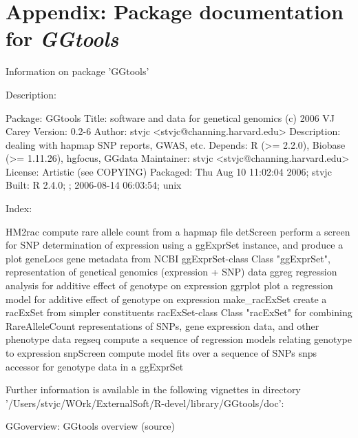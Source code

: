 \documentclass[12pt]{article}
\newcommand{\Rpackage}[1]{{\textit{#1}}}
\begin{document}
\section{Appendix: Package documentation for \Rpackage{GGtools}}
\begin{Schunk}
\begin{Soutput}
		Information on package 'GGtools'

Description:


Package:       GGtools
Title:         software and data for genetical genomics (c) 2006 VJ
               Carey
Version:       0.2-6
Author:        stvjc <stvjc@channing.harvard.edu>
Description:   dealing with hapmap SNP reports, GWAS, etc.
Depends:       R (>= 2.2.0), Biobase (>= 1.11.26), hgfocus, GGdata
Maintainer:    stvjc <stvjc@channing.harvard.edu>
License:       Artistic (see COPYING)
Packaged:      Thu Aug 10 11:02:04 2006; stvjc
Built:         R 2.4.0; ; 2006-08-14 06:03:54; unix


Index:


HM2rac                  compute rare allele count from a hapmap file
detScreen               perform a screen for SNP determination of
                        expression using a ggExprSet instance, and
                        produce a plot
geneLocs                gene metadata from NCBI
ggExprSet-class         Class "ggExprSet", representation of genetical
                        genomics (expression + SNP) data
ggreg                   regression analysis for additive effect of
                        genotype on expression
ggrplot                 plot a regression model for additive effect of
                        genotype on expression
make_racExSet           create a racExSet from simpler constituents
racExSet-class          Class "racExSet" for combining RareAlleleCount
                        representations of SNPs, gene expression data,
                        and other phenotype data
regseq                  compute a sequence of regression models
                        relating genotype to expression
snpScreen               compute model fits over a sequence of SNPs
snps                    accessor for genotype data in a ggExprSet


Further information is available in the following vignettes in
directory '/Users/stvjc/WOrk/ExternalSoft/R-devel/library/GGtools/doc':


GGoverview: GGtools overview (source)
\end{Soutput}
\end{Schunk}
\end{document}
